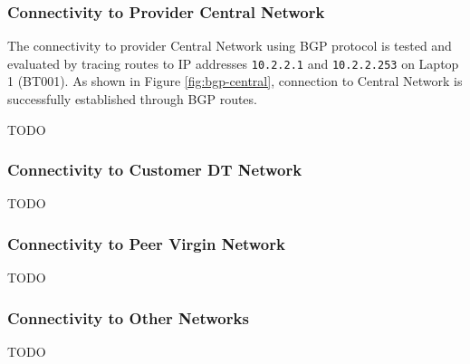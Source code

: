 \clearpage


\subsubsection{Connectivity to Provider Central Network}

The connectivity to provider Central Network using BGP protocol is tested and evaluated by tracing routes to IP addresses \texttt{10.2.2.1} and \texttt{10.2.2.253} on Laptop 1 (BT001). As shown in Figure \ref{fig:bgp-central}, connection to Central Network is successfully established through BGP routes.

TODO



\clearpage


\subsubsection{Connectivity to Customer DT Network}
TODO




\clearpage

\subsubsection{Connectivity to Peer Virgin Network}
TODO




\clearpage


\subsubsection{Connectivity to Other Networks}
TODO



\clearpage


